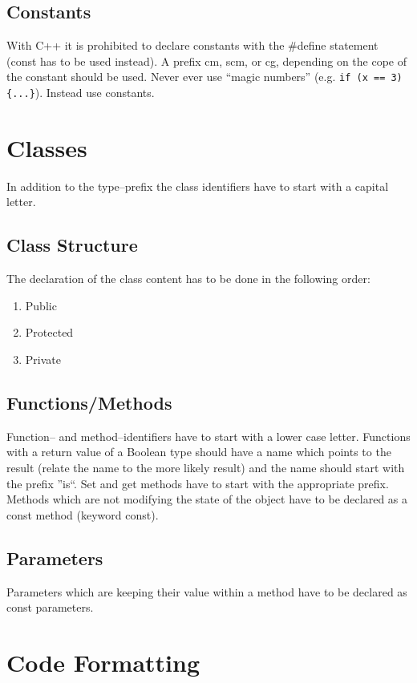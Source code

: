 \documentclass[final,a4paper,10pt, oneside]{article}
\begin{document}
\subsection{Constants}
 With C++ it is prohibited to declare constants with the \#define statement (const has to be used instead). 
 A prefix cm, scm, or cg, depending on the cope of the constant should be used.
 Never ever use ``magic numbers'' 
(e.g. \verb|if (x == 3){...}|). Instead use constants.




\section{Classes}
In addition to the type--prefix the class identifiers have to start with a capital letter.
\subsection{Class Structure}
 The declaration of the class content has to be done in the following order:
\begin{enumerate}
\item Public
\item Protected
\item Private
\end{enumerate}

\subsection{Functions/Methods}
Function-- and method--identifiers have to start with a lower case letter. Functions with a return value of a Boolean type should have a name which points to the result (relate the name to the more likely result) and the name should start with the prefix ''is``. Set and get methods have to start with the appropriate prefix. Methods which are not modifying the state of the object have to be declared as a const method (keyword const).

\subsection{Parameters}
Parameters which are keeping their value within a method have to be declared as const parameters.

\section{Code Formatting}
\end{document}
